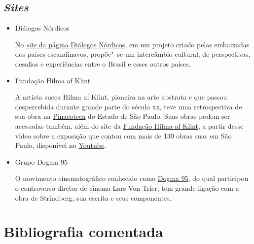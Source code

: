 \documentclass[12pt]{extarticle}
\begin{document}
\subsection{\emph{Sites}}

\begin{itemize}
\item Diálogos Nórdicos

No \href{https://www.dialogosnordicos.com/?fbclid=IwAR0XdcQuRZ3HH0mRrjc-z5BpiSHjWi9uj9mjTTrJ0GWvHTSsVQdf4tA4po8}{\emph{site} da página Diálogos Nórdicos}, em um 
projeto criado pelas embaixadas dos países escandinavos, propõe"--se um 
intercâmbio cultural, de perspectivas, desafios e experiências entre 
o Brasil e esses outros países.

\item Fundação Hilma af Klint

A artista sueca Hilma af Klint, pioneira na arte abstrata e que passou despercebida durante grande parte do século \textsc{xx}, teve uma retrospectiva de sua obra na \href{https://pinacoteca.org.br/en/programacao/hilma-af-klint/}{Pinacoteca} do Estado de São Paulo. Suas obras podem ser acessadas também, além do site da \href{https://www.hilmaafklint.se/en/}{Fundação Hilma af Klint}, a partir desse vídeo sobre a exposição que contou com mais de 130 obras suas em São Paulo, disponível no \href{https://www.youtube.com/watch?v=jBMQSHFEUaw&ab_channel=TVCRECI}{Youtube}.

\item Grupo Dogma 95

O movimento cinematográfico conhecido como \href{https://www.institutodecinema.com.br/mais/conteudo/movimentos-do-cinema-o-que-foi-o-dogma-95}{Dogma 95}, do qual participou o controverso diretor de cinema Lars Von Trier, tem grande 
ligação com a obra de Strindberg, sua escrita e seus componentes.
\end{itemize}

\section{Bibliografia comentada}
\end{document}
